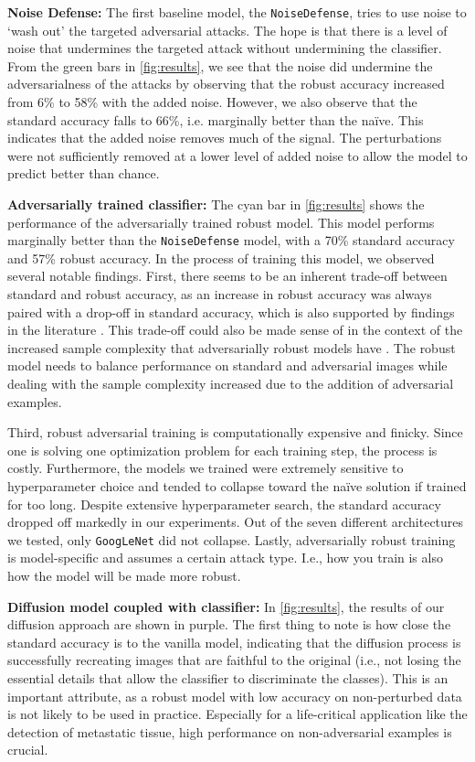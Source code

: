 \textbf{Noise Defense:}
The first baseline model, the \texttt{NoiseDefense}, tries to use noise to `wash out' the targeted adversarial attacks. The hope is that there is a level of noise that undermines the targeted attack without undermining the classifier. From the green bars in \autoref{fig:results}, we see that the noise did undermine the adversarialness of the attacks by observing that the robust accuracy increased from 6\% to 58\% with the added noise. However, we also observe that the standard accuracy falls to 66\%, i.e. marginally better than the naïve. This indicates that the added noise removes much of the signal. The perturbations were not sufficiently removed at a lower level of added noise to allow the model to predict better than chance.


\textbf{Adversarially trained classifier:}
The cyan bar in \autoref{fig:results} shows the performance of the adversarially trained robust model. This model performs marginally better than the \texttt{NoiseDefense} model, with a 70\% standard accuracy and 57\% robust accuracy. In the process of training this model, we observed several notable findings. First, there seems to be an inherent trade-off between standard and robust accuracy, as an increase in robust accuracy was always paired with a drop-off in standard accuracy, which is also supported by findings in the literature \cite{raghunathan2020understanding}. This trade-off could also be made sense of in the context of the increased sample complexity that adversarially robust models have \cite{schmidt2018adversarially}. The robust model needs to balance performance on standard and adversarial images while dealing with the sample complexity increased due to the addition of adversarial examples.


Third, robust adversarial training is computationally expensive and finicky. Since one is solving one optimization problem for each training step, the process is costly. Furthermore, the models we trained were extremely sensitive to hyperparameter choice and tended to collapse toward the naïve solution if trained for too long. Despite extensive hyperparameter search, the standard accuracy dropped off markedly in our experiments. Out of the seven different architectures we tested, only \texttt{GoogLeNet} did not collapse. Lastly, adversarially robust training is model-specific and assumes a certain attack type. I.e., how you train is also how the model will be made more robust. 


\textbf{Diffusion model coupled with classifier:}
In \autoref{fig:results}, the results of our diffusion approach are shown in purple. The first thing to note is how close the standard accuracy is to the vanilla model, indicating that the diffusion process is successfully recreating images that are faithful to the original (i.e., not losing the essential details that allow the classifier to discriminate the classes). This is an important attribute, as a robust model with low accuracy on non-perturbed data is not likely to be used in practice. Especially for a life-critical application like the detection of metastatic tissue, high performance on non-adversarial examples is crucial.

